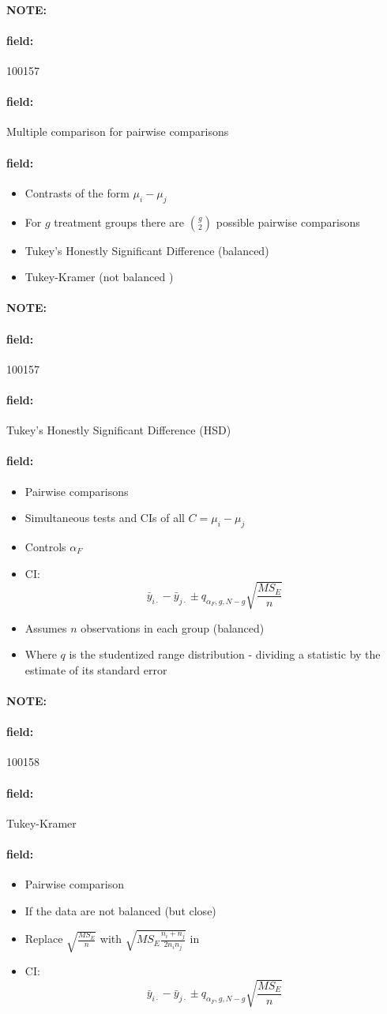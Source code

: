 \documentclass[12pt]{article}
\newenvironment{note}{\paragraph{NOTE:}}{}
\newenvironment{field}{\paragraph{field:}}{}
\begin{document}
\begin{note}
 \begin{field}
  \tiny 100157
 \end{field}
 \begin{field}
  Multiple comparison for pairwise comparisons
 \end{field}
 \begin{field}
  \begin{itemize}
   \item Contrasts of the form $\mu_i - \mu_j$
   \item For $g$ treatment groups there are $\binom{g}{2}$ possible pairwise comparisons
   \item Tukey's Honestly Significant Difference (balanced)
   \item Tukey-Kramer (not balanced )
  \end{itemize}
 \end{field}
\end{note}

\begin{note}
 \begin{field}
  \tiny 100157
 \end{field}
 \begin{field}
  Tukey's Honestly Significant Difference (HSD)
 \end{field}
 \begin{field}
  \begin{itemize}
   \item Pairwise comparisons
   \item Simultaneous tests and CIs of all $C = \mu_i - \mu_j$
   \item Controls $\alpha_F$
   \item CI: $$\bar{y}_{i\cdot} - \bar{y}_{j\cdot} \pm q_{\alpha_F, g, N-g}\sqrt{\frac{MS_E}{n}} $$
   \item Assumes $n$ observations in each group (balanced)
   \item Where $q$ is the studentized range distribution - dividing a statistic by the estimate of its standard error
  \end{itemize}
 \end{field}
\end{note}


\begin{note}
 \begin{field}
  \tiny 100158
 \end{field}
 \begin{field}
  Tukey-Kramer
 \end{field}
 \begin{field}
  \begin{itemize}
   \item Pairwise comparison
   \item If the data are not balanced (but close)
   \item Replace $\sqrt{\frac{MS_E}{n}}$ with $\sqrt{MS_E \frac{n_i + n_j}{2n_in_j}}$ in
   \item  CI: $$\bar{y}_{i\cdot} - \bar{y}_{j\cdot} \pm q_{\alpha_F, g, N-g}\sqrt{\frac{MS_E}{n}} $$
  \end{itemize}
 \end{field}
\end{note}
\end{document}
